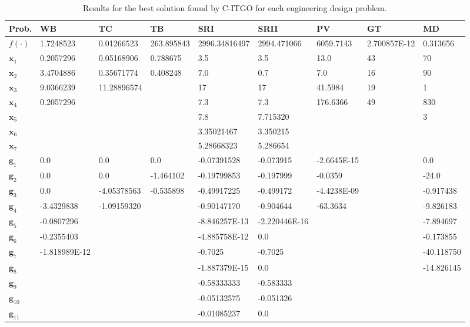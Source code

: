 
\noindent
\begin{table*}[h]
    \tiny
\begin{center}
\begin{adjustwidth}{-1cm}{}
\begin{tabular}{ | P{1.0cm} | P{1.5cm} |  P{1.5cm} | P{1.5cm} | P{1.5cm} | P{1.5cm} | P{1.5cm} | P{1.5cm} | P{1.5cm} |  }
\hline
\textbf{Prob.} & \textbf{WB} & \textbf{TC} & \textbf{TB} & \textbf{SRI} & \textbf{SRII} & \textbf{PV} & \textbf{GT} & \textbf{MD} \\
\hline
\rule{0pt}{3ex}
$f(\cdot)$ & 1.7248523 & 0.01266523 & 263.895843 & 2996.34816497 & 2994.471066 & 6059.7143 & 2.700857E-12 & 0.313656 \\
\hline
\rule{0pt}{3ex}
$\bm{x}_1$ &  0.2057296 & 0.05168906 & 0.788675 & 3.5 & 3.5 & 13.0 & 43 & 70  \\
$\bm{x}_2$ &  3.4704886 & 0.35671774 & 0.408248 & 7.0 & 0.7 & 7.0 & 16 & 90 \\
$\bm{x}_3$ &  9.0366239 & 11.28896574 & & 17 & 17 & 41.5984 & 19 &  1  \\
$\bm{x}_4$ &  0.2057296 & & & 7.3 & 7.3 & 176.6366 & 49 & 830  \\
$\bm{x}_5$ & & & & 7.8 & 7.715320 & & & 3 \\
$\bm{x}_6$ & & & & 3.35021467 & 3.350215 & & &   \\
$\bm{x}_7$ & & & & 5.28668323 & 5.286654 & & &   \\
\hline
\rule{0pt}{3ex}
$\bm{g}_1$ & 0.0 & 0.0 & 0.0 & -0.07391528 & -0.073915 & -2.6645E-15 & & 0.0  \\
$\bm{g}_2$ & 0.0 & 0.0 & -1.464102 & -0.19799853 & -0.197999 & -0.0359 & & -24.0  \\
$\bm{g}_3$ & 0.0 & -4.05378563 & -0.535898 & -0.49917225 & -0.499172 & -4.4238E-09 & & -0.917438 \\
$\bm{g}_4$ & -3.4329838 & -1.09159320 & & -0.90147170 & -0.904644 & -63.3634 & & -9.826183  \\
$\bm{g}_5$ & -0.0807296 & & & -8.846257E-13 & -2.220446E-16 & & &  -7.894697 \\
$\bm{g}_6$ & -0.2355403 & & & -4.885758E-12 & 0.0 & & & -0.173855  \\
$\bm{g}_7$ & -1.818989E-12 & & & -0.7025 & -0.7025 & & & -40.118750 \\
$\bm{g}_8$ & & & & -1.887379E-15 & 0.0 & & &  -14.826145 \\
$\bm{g}_9$ & & & & -0.58333333 & -0.583333 & & &    \\
$\bm{g}_{10}$ & & & & -0.05132575 & -0.051326 & & &    \\
$\bm{g}_{11}$ & & & & -0.01085237 & 0.0 & & &    \\
\hline
\end{tabular}
\end{adjustwidth}
\end{center}
\vspace*{-6mm}
\caption{Results for the best solution found by C-ITGO for each engineering design problem. \\[1em]}
\label{tab:BestResults}
\end{table*}


